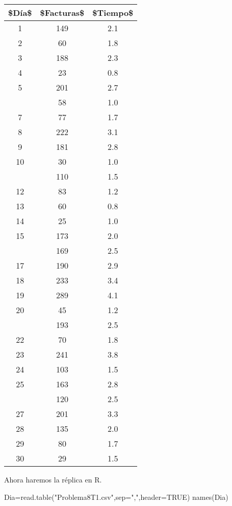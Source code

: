 \documentclass[
  a4paper,
  oneside,
  openany]{book}
\newenvironment{Shaded}{\begin{snugshade}}{\end{snugshade}}
\newcommand{\AttributeTok}[1]{\textcolor[rgb]{0.77,0.63,0.00}{#1}}
\newcommand{\ConstantTok}[1]{\textcolor[rgb]{0.00,0.00,0.00}{#1}}
\newcommand{\FunctionTok}[1]{\textcolor[rgb]{0.00,0.00,0.00}{#1}}
\newcommand{\NormalTok}[1]{#1}
\newcommand{\OtherTok}[1]{\textcolor[rgb]{0.56,0.35,0.01}{#1}}
\newcommand{\StringTok}[1]{\textcolor[rgb]{0.31,0.60,0.02}{#1}}
\begin{document}
\begin{table}[H]
\centering
\begin{tabular}{ccc}
\toprule
\$Día\$ & \$Facturas\$ & \$Tiempo\$\\
\midrule
1 & 149 & 2.1\\
2 & 60 & 1.8\\
3 & 188 & 2.3\\
4 & 23 & 0.8\\
5 & 201 & 2.7\\
\addlinespace
6 & 58 & 1.0\\
7 & 77 & 1.7\\
8 & 222 & 3.1\\
9 & 181 & 2.8\\
10 & 30 & 1.0\\
\addlinespace
11 & 110 & 1.5\\
12 & 83 & 1.2\\
13 & 60 & 0.8\\
14 & 25 & 1.0\\
15 & 173 & 2.0\\
\addlinespace
16 & 169 & 2.5\\
17 & 190 & 2.9\\
18 & 233 & 3.4\\
19 & 289 & 4.1\\
20 & 45 & 1.2\\
\addlinespace
21 & 193 & 2.5\\
22 & 70 & 1.8\\
23 & 241 & 3.8\\
24 & 103 & 1.5\\
25 & 163 & 2.8\\
\addlinespace
26 & 120 & 2.5\\
27 & 201 & 3.3\\
28 & 135 & 2.0\\
29 & 80 & 1.7\\
30 & 29 & 1.5\\
\bottomrule
\end{tabular}
\end{table}

Ahora haremos la réplica en R.

\begin{Shaded}
\begin{Highlighting}[]
\NormalTok{Dia}\OtherTok{=}\FunctionTok{read.table}\NormalTok{(}\StringTok{"Problema8T1.csv"}\NormalTok{,}\AttributeTok{sep=}\StringTok{","}\NormalTok{,}\AttributeTok{header=}\ConstantTok{TRUE}\NormalTok{)}
\FunctionTok{names}\NormalTok{(Dia)}
\end{Highlighting}
\end{Shaded}
\end{document}
